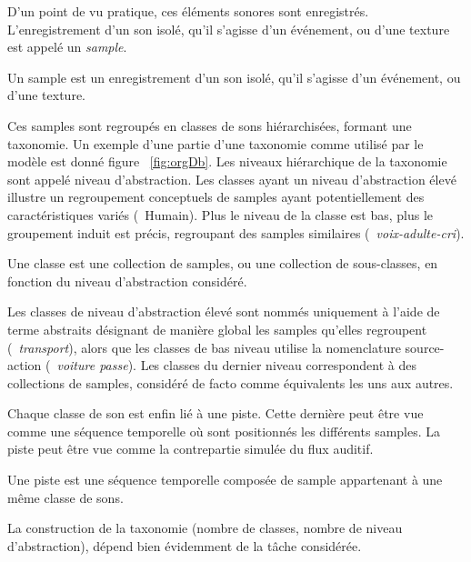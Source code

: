 D'un point de vu pratique, ces éléments sonores sont enregistrés. L'enregistrement d'un son isolé, qu'il s'agisse d'un événement, ou d'une texture est appelé un \emph{sample}. 

\begin{mydef}
Un sample est un enregistrement d'un son isolé, qu'il s'agisse d'un événement, ou d'une texture.
\end{mydef}


Ces samples sont regroupés en classes de sons hiérarchisées, formant une taxonomie. Un exemple d'une partie d'une taxonomie comme utilisé par le modèle est donné figure ~\ref{fig:orgDb}. Les niveaux hiérarchique de la taxonomie sont appelé niveau d'abstraction.  Les classes ayant un niveau d'abstraction élevé illustre un regroupement conceptuels de samples ayant potentiellement des caractéristiques variés (\ie~{Humain}). Plus le niveau de la classe est bas, plus le groupement induit est précis, regroupant des samples similaires (\ie~\emph{voix-adulte-cri}). 

\begin{mydef}
Une classe est une collection de samples, ou une collection de sous-classes, en fonction du niveau d'abstraction considéré.
\end{mydef}

Les classes de niveau d'abstraction élevé sont nommés uniquement à l'aide de terme abstraits désignant de manière global les samples qu'elles regroupent (\eg~\emph{transport}), alors que les classes de bas niveau utilise la nomenclature source-action (\eg~\emph{voiture passe}). Les classes du dernier niveau correspondent à des collections de samples, considéré de facto comme équivalents les uns aux autres.

Chaque classe de son est enfin lié à une piste. Cette dernière peut être vue comme une séquence temporelle où sont positionnés les différents samples. La piste peut être vue comme la contrepartie simulée du flux auditif.

\begin{mydef}
Une piste est une séquence temporelle composée de sample appartenant à une même classe de sons.
\end{mydef}

La construction de la taxonomie (nombre de classes, nombre de niveau d'abstraction), dépend bien évidemment de la tâche considérée. 

